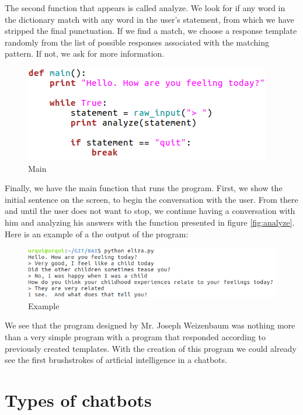\documentclass[12pt,twoside]{article}
\theoremstyle{plain}
\theoremstyle{definition}
\theoremstyle{remark}
\begin{document}
The second function that appears is called analyze. We look for if any word in the dictionary match with any word in the user's statement, from which we have stripped the final punctuation. If we find a match, we choose a response template randomly from the list of possible responses associated with the matching pattern. If not, we ask for more information.
\begin{figure}[h]
\centering
\includegraphics[scale=0.6]{./Pictures/main.png}
\caption{Main}
\label{fig:main}
\end{figure}
Finally, we have the main function that runs the program. First, we show the initial sentence on the screen, to begin the conversation with the user. From there and until the user does not want to stop, we continue having a conversation with him and analyzing his answers with the function presented in figure \ref{fig:analyze}.\\

Here is an example of a the output of the program:



\begin{figure}[h]
\centering
\includegraphics[scale=0.6]{./Pictures/example.png}
\caption{Example}
\end{figure}

We see that the program designed by Mr. Joseph Weizenbaum was nothing more than a very simple program with a program that responded according to previously created templates. With the creation of this program we could already see the first brushstrokes of artficial intelligence in a chatbots.
 



\section{Types of chatbots}
\label{sec:types}
\end{document}
